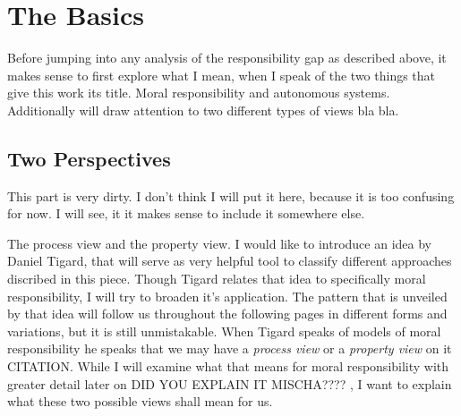 \documentclass{article}
\begin{document}
%
%
%
%
%
\newpage
\section{The Basics}
Before jumping into any analysis of the responsibility gap as described above,
it makes sense to first explore what I mean, when I speak of the two things that
give this work its title. Moral responsibility and autonomous systems.
Additionally will draw attention to two different types of views bla bla.
\subsection{Two Perspectives}

This part is very dirty. I don't think I will put it here, because it is too
confusing for now. I will see, it it makes sense to include it somewhere else.



The process view and the property view.
I would like to introduce an idea by Daniel Tigard, that will serve as very
helpful tool to classify different approaches discribed in this piece. Though
Tigard relates that idea to specifically moral responsibility, I will try to
broaden it's application. The pattern that is unveiled by that idea will follow
us throughout the following pages in different forms and variations, but it is
still unmistakable. When Tigard speaks of models of moral responsibility he
speaks that we may have a \textit{process view} or a \textit{property view} on
it CITATION. While I will examine what that means for moral responsibility with greater
detail later on
DID YOU EXPLAIN IT MISCHA????
, I want to explain what these two possible views shall mean for us.
\end{document}
